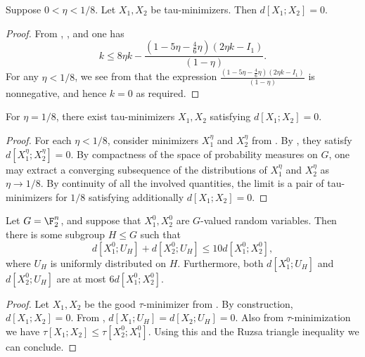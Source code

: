 \begin{theorem}\label{de-prop-improv}\leanok
Suppose $0 < \eta < 1/8$.  Let $X_1, X_2$ be tau-minimizers.  Then $d[X_1;X_2] = 0$.
\end{theorem}

\begin{proof}\leanok
From , , and  one has
  \[ k \leq 8\eta k - \frac{(1 -5 \eta - \frac{4}{6} \eta)(2 \eta k - I_1)}{(1-\eta)}.\]
  For any $\eta < 1/8$, we see from  that the expression $\frac{(1 -5 \eta - \frac{4}{6} \eta)(2 \eta k - I_1)}{(1-\eta)}$ is nonnegative, and hence $k = 0$ as required.
\end{proof}


\begin{theorem}\label{de-prop-lim-improv}\leanok
For $\eta = 1/8$, there exist tau-minimizers $X_1, X_2$ satisfying $d[X_1;X_2] = 0$.
\end{theorem}
\begin{proof}\leanok
For each $\eta<1/8$, consider minimizers $X_1^\eta$ and $X_2^\eta$ from .
By ,
they satisfy $d[X_1^\eta; X_2^\eta]=0$. By compactness of the space of probability measures
on $G$, one may extract a converging subsequence of the distributions of $X_1^\eta$ and $X_2^\eta$
as $\eta \to 1/8$. By continuity of all the involved quantities, the limit is a pair of
tau-minimizers for $1/8$ satisfying additionally $d[X_1;X_2] = 0$.
\end{proof}

\begin{theorem}\label{entropy-pfr-improv}\leanok
  Let $G = \F_2^n$, and suppose that $X^0_1, X^0_2$ are $G$-valued random variables.
  Then there is some subgroup $H \leq G$ such that
  \[
    d[X^0_1;U_H] + d[X^0_2;U_H] \le 10 d[X^0_1;X^0_2],
  \]
  where $U_H$ is uniformly distributed on $H$.
  Furthermore, both $d[X^0_1;U_H]$ and $d[X^0_2;U_H]$ are at most $6 d[X^0_1;X^0_2]$.
\end{theorem}

\begin{proof}\leanok
Let $X_1, X_2$ be the good $\tau$-minimizer from . By construction, $d[X_1;X_2]=0$.
From , $d[X_1;U_H] = d[X_2; U_H] = 0$.  Also from $\tau$-minimization we have $\tau[X_1;X_2] \leq \tau[X^0_2;X^0_1]$.  Using this and the Ruzsa triangle inequality we can conclude.
\end{proof}

